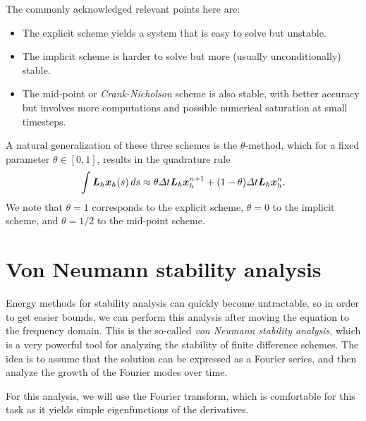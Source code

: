     The commonly acknowledged relevant points here are: 
    \begin{itemize}
        \item The explicit scheme yields a system that is easy to solve but unstable.
        \item The implicit scheme is harder to solve but more (usually unconditionally) stable.
        \item The mid-point or \emph{Crank-Nicholson} scheme is also stable, with better accuracy but involves more computations and possible numerical saturation at small timesteps.
    \end{itemize}
A natural generalization of these three schemes is the $\theta$-method, which for a fixed parameter $\theta\in[0,1]$, results in the quadrature rule
\begin{equation}
    \int \mat L_h \vec x_h(s)\,ds \approx \theta\Delta t \mat L_h\vec x_h^{n+1} + (1-\theta)\Delta t \mat L_h \vec x_h^n.
\end{equation}
We note that $\theta=1$ corresponds to the explicit scheme, $\theta=0$ to the implicit scheme, and $\theta=1/2$ to the mid-point scheme. 
    
\section{Von Neumann stability analysis}
Energy methods for stability analysis can quickly become untractable, so in order to get easier bounds, we can perform this analysis after moving the equation to the frequency domain. This is the so-called \emph{von Neumann stability analysis}, which is a very powerful tool for analyzing the stability of finite difference schemes. The idea is to assume that the solution can be expressed as a Fourier series, and then analyze the growth of the Fourier modes over time.

For this analysis, we will use the Fourier transform, which is comfortable for this task as it yields simple eigenfunctions of the derivatives. 

